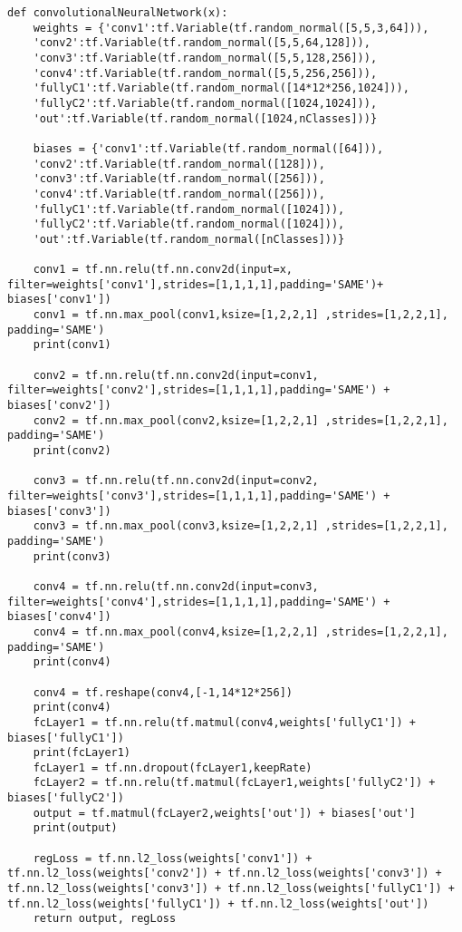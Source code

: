\documentclass[a4paper,11pt]{article}
\begin{document}
\begin{lstlisting}[label={list:second}]
def convolutionalNeuralNetwork(x):
	weights = {'conv1':tf.Variable(tf.random_normal([5,5,3,64])),
	'conv2':tf.Variable(tf.random_normal([5,5,64,128])),
	'conv3':tf.Variable(tf.random_normal([5,5,128,256])),
	'conv4':tf.Variable(tf.random_normal([5,5,256,256])),
	'fullyC1':tf.Variable(tf.random_normal([14*12*256,1024])),
	'fullyC2':tf.Variable(tf.random_normal([1024,1024])),
	'out':tf.Variable(tf.random_normal([1024,nClasses]))}
	
	biases = {'conv1':tf.Variable(tf.random_normal([64])),
	'conv2':tf.Variable(tf.random_normal([128])),
	'conv3':tf.Variable(tf.random_normal([256])),
	'conv4':tf.Variable(tf.random_normal([256])),
	'fullyC1':tf.Variable(tf.random_normal([1024])),
	'fullyC2':tf.Variable(tf.random_normal([1024])),
	'out':tf.Variable(tf.random_normal([nClasses]))}
	
	conv1 = tf.nn.relu(tf.nn.conv2d(input=x, filter=weights['conv1'],strides=[1,1,1,1],padding='SAME')+ biases['conv1'])
	conv1 = tf.nn.max_pool(conv1,ksize=[1,2,2,1] ,strides=[1,2,2,1], padding='SAME')
	print(conv1)
	
	conv2 = tf.nn.relu(tf.nn.conv2d(input=conv1, filter=weights['conv2'],strides=[1,1,1,1],padding='SAME') + biases['conv2'])
	conv2 = tf.nn.max_pool(conv2,ksize=[1,2,2,1] ,strides=[1,2,2,1], padding='SAME')
	print(conv2)
	
	conv3 = tf.nn.relu(tf.nn.conv2d(input=conv2, filter=weights['conv3'],strides=[1,1,1,1],padding='SAME') + biases['conv3'])
	conv3 = tf.nn.max_pool(conv3,ksize=[1,2,2,1] ,strides=[1,2,2,1], padding='SAME')
	print(conv3)
	
	conv4 = tf.nn.relu(tf.nn.conv2d(input=conv3, filter=weights['conv4'],strides=[1,1,1,1],padding='SAME') + biases['conv4'])
	conv4 = tf.nn.max_pool(conv4,ksize=[1,2,2,1] ,strides=[1,2,2,1], padding='SAME')
	print(conv4)
	
	conv4 = tf.reshape(conv4,[-1,14*12*256])
	print(conv4)
	fcLayer1 = tf.nn.relu(tf.matmul(conv4,weights['fullyC1']) + biases['fullyC1'])
	print(fcLayer1)
	fcLayer1 = tf.nn.dropout(fcLayer1,keepRate)
	fcLayer2 = tf.nn.relu(tf.matmul(fcLayer1,weights['fullyC2']) + biases['fullyC2'])
	output = tf.matmul(fcLayer2,weights['out']) + biases['out']
	print(output)
	
	regLoss = tf.nn.l2_loss(weights['conv1']) + tf.nn.l2_loss(weights['conv2']) + tf.nn.l2_loss(weights['conv3']) + tf.nn.l2_loss(weights['conv3']) + tf.nn.l2_loss(weights['fullyC1']) + tf.nn.l2_loss(weights['fullyC1']) + tf.nn.l2_loss(weights['out'])
	return output, regLoss
\end{lstlisting}
\end{document}
